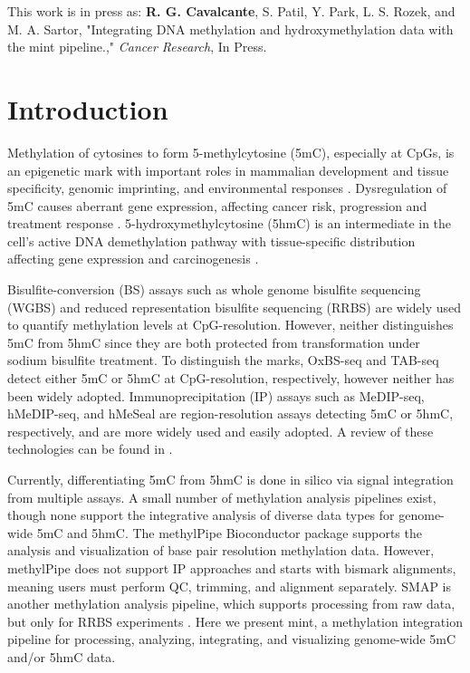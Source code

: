 \noindent This work is in press as: \textbf{R. G. Cavalcante}, S. Patil, Y. Park, L. S. Rozek, and M. A. Sartor, "Integrating DNA methylation and hydroxymethylation data with the mint pipeline.," \emph{Cancer Research}, In Press.

\section{Introduction}
\label{mint_introduction}

Methylation of cytosines to form 5-methylcytosine (5mC), especially at CpGs, is an epigenetic mark with important roles in mammalian development and tissue specificity, genomic imprinting, and environmental responses \cite{Schubeler:2015it}. Dysregulation of 5mC causes aberrant gene expression, affecting cancer risk, progression and treatment response \cite{Baylin:2011ef}. 5-hydroxymethylcytosine (5hmC) is an intermediate in the cell's active DNA demethylation pathway with tissue-specific distribution affecting gene expression \cite{Branco:2011gg} and carcinogenesis \cite{Rampal:2014ka}.

Bisulfite-conversion (BS) assays such as whole genome bisulfite sequencing (WGBS) and reduced representation bisulfite sequencing (RRBS) are widely used to quantify methylation levels at CpG-resolution. However, neither distinguishes 5mC from 5hmC since they are both protected from transformation under sodium bisulfite treatment. To distinguish the marks, OxBS-seq and TAB-seq detect either 5mC or 5hmC at CpG-resolution, respectively, however neither has been widely adopted. Immunoprecipitation (IP) assays such as MeDIP-seq, hMeDIP-seq, and hMeSeal are region-resolution assays detecting 5mC or 5hmC, respectively, and are more widely used and easily adopted. A review of these technologies can be found in \cite{Song:2012eb}.

Currently, differentiating 5mC from 5hmC is done in silico via signal integration from multiple assays. A small number of methylation analysis pipelines exist, though none support the integrative analysis of diverse data types for genome-wide 5mC and 5hmC. The methylPipe Bioconductor package \cite{Kishore:2015jg} supports the analysis and visualization of base pair resolution methylation data. However, methylPipe does not support IP approaches and starts with bismark alignments, meaning users must perform QC, trimming, and alignment separately. SMAP is another methylation analysis pipeline, which supports processing from raw data, but only for RRBS experiments \cite{Wang:2015dc}. Here we present mint, a methylation integration pipeline for processing, analyzing, integrating, and visualizing genome-wide 5mC and/or 5hmC data.

